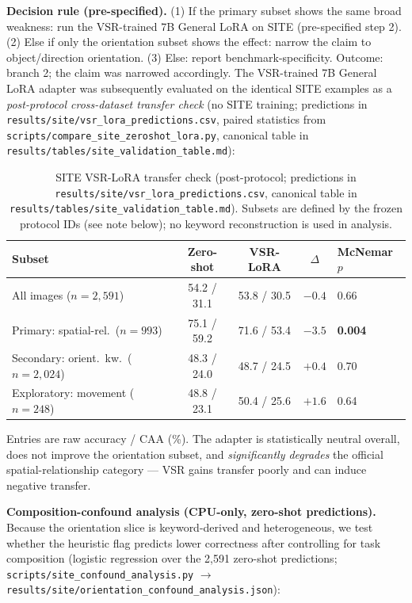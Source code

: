 \textbf{Decision rule (pre-specified).} (1) If the primary subset shows the same
broad weakness: run the VSR-trained 7B General LoRA on SITE (pre-specified step
2). (2) Else if only the orientation subset shows the effect: narrow the claim
to object/direction orientation. (3) Else: report benchmark-specificity. Outcome:
branch 2; the claim was narrowed accordingly. The VSR-trained 7B General LoRA
adapter was subsequently evaluated on the identical SITE examples as a
\emph{post-protocol cross-dataset transfer check} (no SITE training; predictions
in \texttt{results/site/vsr\_lora\_predictions.csv}, paired statistics from
\texttt{scripts/compare\_site\_zeroshot\_lora.py}, canonical table in
\texttt{results/tables/site\_validation\_table.md}):

\begin{table}[h]
\centering
\footnotesize
\caption{SITE VSR-LoRA transfer check (post-protocol; predictions in
\texttt{results/site/vsr\_lora\_predictions.csv}, canonical table in
\texttt{results/tables/site\_validation\_table.md}). Subsets are defined by the
frozen protocol IDs (see note below); no keyword reconstruction is used in
analysis.}
\label{tab:site-transfer}
\begin{tabular}{lcccl}
\toprule
Subset & Zero-shot & VSR-LoRA & $\Delta$ & McNemar $p$ \\
\midrule
All images ($n{=}2{,}591$) & 54.2 / 31.1 & 53.8 / 30.5 & $-0.4$ & 0.66 \\
Primary: spatial-rel.\ ($n{=}993$) & 75.1 / 59.2 & 71.6 / 53.4 & $-3.5$ & \textbf{0.004} \\
Secondary: orient.\ kw.\ ($n{=}2{,}024$) & 48.3 / 24.0 & 48.7 / 24.5 & $+0.4$ & 0.70 \\
Exploratory: movement ($n{=}248$) & 48.8 / 23.1 & 50.4 / 25.6 & $+1.6$ & 0.64 \\
\bottomrule
\end{tabular}
\end{table}
Entries are raw accuracy / CAA (\%). The adapter is statistically neutral
overall, does not improve the orientation subset, and \emph{significantly
degrades} the official spatial-relationship category --- VSR gains transfer
poorly and can induce negative transfer.

\textbf{Composition-confound analysis (CPU-only, zero-shot predictions).}
Because the orientation slice is keyword-derived and heterogeneous, we test
whether the heuristic flag predicts lower correctness after controlling for
task composition (logistic regression over the 2,591 zero-shot predictions;
\texttt{scripts/site\_confound\_analysis.py} $\rightarrow$
\texttt{results/site/orientation\_confound\_analysis.json}):

